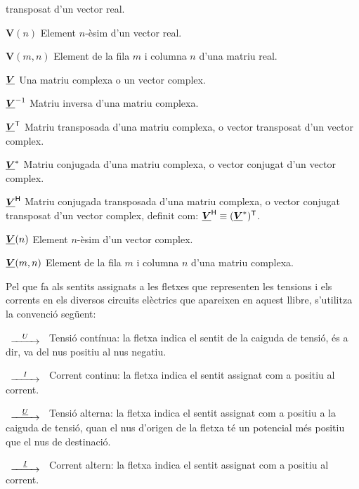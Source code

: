 \begin{list}{}
    transposat d'un vector real.
    \item[$\boldsymbol{V}(n)$] Element $n$-èsim d'un vector real.
    \item[$\boldsymbol{V}(m,n)$] Element de la fila $m$ i columna $n$ d'una matriu real.
    \item[$\underline{\boldsymbol{V}}$] Una matriu complexa o un vector complex.
    \item[$\underline{\boldsymbol{V}}^{-1}$] Matriu inversa d'una matriu complexa.
    \item[$\underline{\boldsymbol{V}}^\mathrm{\textsf{T}}$] Matriu transposada d'una matriu complexa, o vector
    transposat d'un vector complex.
    \item[$\underline{\boldsymbol{V}}^*$] Matriu conjugada d'una matriu complexa, o vector
    conjugat d'un vector complex.
    \item[$\underline{\boldsymbol{V}}^\mathrm{\textsf{H}}$] Matriu conjugada transposada d'una matriu complexa, o vector
    conjugat transposat d'un vector complex, definit com: $\underline{\boldsymbol{V}}^\mathrm{\textsf{H}} \equiv
    (\underline{\boldsymbol{V}}^*)^\mathrm{\textsf{T}}$.
    \item[$\underline{\boldsymbol{V}}(n)$] Element $n$-èsim d'un vector complex.
    \item[$\underline{\boldsymbol{V}}(m,n)$] Element de la fila $m$ i columna $n$ d'una matriu complexa.
\end{list}

Pel que fa als sentits assignats a les fletxes que representen les
tensions i els corrents en els diversos circuits elèctrics que
apareixen en aquest llibre, s'utilitza la convenció següent:

\begin{list}{}
{\setlength{\labelwidth}{15mm} \setlength{\leftmargin}{20mm}
\setlength{\labelsep}{5mm}}
    \item[$\begin{CD} @>U>> \end{CD}$] Tensió contínua: la fletxa indica el sentit
    de la caiguda de tensió, és a dir, va del nus positiu al nus negatiu.
    \item[$\begin{CD} @>I>> \end{CD}$] Corrent
    continu: la fletxa indica el sentit  assignat com a positiu al corrent.
    \item[$\begin{CD} @>\cmplx{U}>> \end{CD}$] Tensió alterna: la fletxa indica el
    sentit assignat com a positiu a la caiguda de tensió, quan el nus d'origen de la fletxa
    té un potencial  més positiu que el nus de destinació.
    \item[$\begin{CD} @>\cmplx{I}>> \end{CD}$] Corrent altern: la fletxa
    indica el sentit  assignat com a positiu al corrent.
\end{list}

